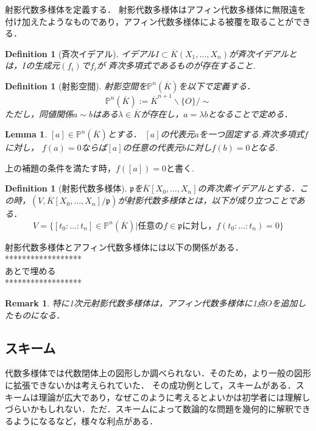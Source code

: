 \documentclass{ujarticle}
\newtheorem{dfn}[thm]{Definition}
\newtheorem{lem}[thm]{Lemma}
\newtheorem*{rem}{Remark}
\begin{document}
射影代数多様体を定義する．
射影代数多様体はアフィン代数多様体に無限遠を付け加えたようなものであり，アフィン代数多様体による被覆を取ることができる．
\begin{dfn}[斉次イデアル]
イデアル$I\subset \overline{K}(X_1,\dots,X_n)$が斉次イデアルとは，$I$の生成元$(f_i)$で$f_i$が
斉次多項式であるものが存在すること.
\end{dfn}

\begin{dfn}[射影空間]
射影空間を$\mathbb{P}^n(\overline{K})$を以下で定義する．
\begin{equation*}
 \mathbb{P}^n(\overline{K}):=\overline{K}^{n+1}\backslash\{O\}/\sim
\end{equation*}
ただし，同値関係$a \sim b$はある$\lambda \in \overline{K}$が存在し，$a= \lambda b$となることで定める．
\end{dfn}

\begin{lem}
 $[a] \in \mathbb{P}^n(\overline{K})$とする． $[a]$の代表元$a$を一つ固定する.斉次多項式$f$に対し，
 $f(a)=0$ならば$[a]$の任意の代表元$b$に対し$f(b)=0$となる.
\end{lem}

上の補題の条件を満たす時，$f([a])=0$と書く.

\begin{dfn}[射影代数多様体]
  $\mathfrak{p}$を$\overline{K}[X_0,\dots,X_n]$の斉次素イデアルとする．この時，$(V,\overline{K}[X_0,\dots,X_n]/\mathfrak{p})$が射影代数多様体とは，以下が成り立つことである．
  \begin{equation*}
   V=\{[t_0:\dots:t_n] \in \mathbb{P}^n(\overline{K}) |   \mbox{任意の}f \in \mathfrak{p} \mbox{に対し，}f(t_0: \dots :t_n)=0\}
  \end{equation*}
\end{dfn}
射影代数多様体とアフィン代数多様体には以下の関係がある．
******************\\
あとで埋める \\
******************
\begin{rem}
  特に1次元射影代数多様体は，アフィン代数多様体に1点$O$を追加したものになる．
\end{rem}

\subsection{スキーム}
\label{sub:スキーム}
代数多様体では代数閉体上の図形しか調べられない．そのため，より一般の図形に拡張できないかは考えられていた．
その成功例として，スキームがある．スキームは理論が広大であり，なぜこのように考えるとよいかは初学者には理解しづらいかもしれない．ただ．スキームによって数論的な問題を幾何的に解釈できるようになるなど，様々な利点がある．
\end{document}
